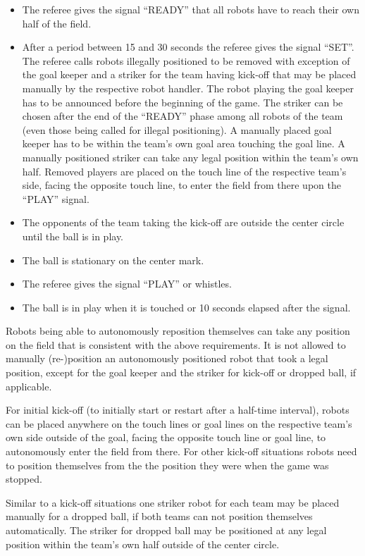 \begin{itemize}
\item The referee gives the signal ``READY'' that all robots have to reach their own half of the field. 
\item After a period between 15 and 30 seconds the referee gives the signal ``SET''. The referee calls robots illegally positioned to be removed with exception of the goal keeper and a striker for the team having kick-off that may be placed manually by the respective robot handler. The robot playing the goal keeper has to be announced before the beginning of the game. The striker can be chosen after the end of the ``READY'' phase among all robots of the team (even those being called for illegal positioning). A manually placed goal keeper has to be within the team's own goal area touching the goal line. A manually positioned striker can take any legal position within the team's own half. Removed players  are placed on the touch line  of the respective team's side, facing the opposite touch line, to enter the field from there upon the ``PLAY'' signal. 
\item The opponents of the team taking the kick-off are outside the center circle until the ball is in play.
\item The ball is stationary on the center mark. 
\item The referee gives the signal ``PLAY'' or whistles.
\item The ball is in play when it is touched or 10 seconds elapsed after the signal.
\end{itemize}

Robots being able to autonomously reposition themselves can take any position on the field that is consistent with the above requirements. It is not allowed to manually (re-)position an autonomously positioned robot that took a legal position, except for the goal keeper and the striker for kick-off or dropped ball, if applicable.
 
For initial kick-off (to initially start or restart after a half-time interval), robots can be placed anywhere on the touch lines or goal lines on the respective team's own side outside of the goal, facing the opposite touch line or goal line, to autonomously enter the field from there. For other kick-off situations robots need to position themselves from the the position they were when the game was stopped.

Similar to a kick-off situations one striker robot for each team may be placed manually for a dropped ball, if both teams can not position themselves automatically. The striker for dropped ball may be positioned at any legal position within the team's own half outside of the center circle.

